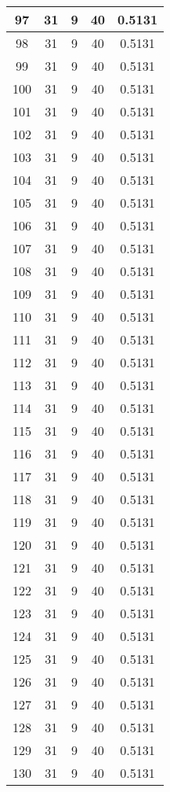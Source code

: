 \documentclass[letterpaper, 12pt]{article}
\begin{document}
\begin{longtable}{|c|c|c|c|c|}
\hline
97 & 31 & 9 & 40 & 0.5131 \\
\hline
98 & 31 & 9 & 40 & 0.5131 \\
\hline
99 & 31 & 9 & 40 & 0.5131 \\
\hline
100 & 31 & 9 & 40 & 0.5131 \\
\hline
101 & 31 & 9 & 40 & 0.5131 \\
\hline
102 & 31 & 9 & 40 & 0.5131 \\
\hline
103 & 31 & 9 & 40 & 0.5131 \\
\hline
104 & 31 & 9 & 40 & 0.5131 \\
\hline
105 & 31 & 9 & 40 & 0.5131 \\
\hline
106 & 31 & 9 & 40 & 0.5131 \\
\hline
107 & 31 & 9 & 40 & 0.5131 \\
\hline
108 & 31 & 9 & 40 & 0.5131 \\
\hline
109 & 31 & 9 & 40 & 0.5131 \\
\hline
110 & 31 & 9 & 40 & 0.5131 \\
\hline
111 & 31 & 9 & 40 & 0.5131 \\
\hline
112 & 31 & 9 & 40 & 0.5131 \\
\hline
113 & 31 & 9 & 40 & 0.5131 \\
\hline
114 & 31 & 9 & 40 & 0.5131 \\
\hline
115 & 31 & 9 & 40 & 0.5131 \\
\hline
116 & 31 & 9 & 40 & 0.5131 \\
\hline
117 & 31 & 9 & 40 & 0.5131 \\
\hline
118 & 31 & 9 & 40 & 0.5131 \\
\hline
119 & 31 & 9 & 40 & 0.5131 \\
\hline
120 & 31 & 9 & 40 & 0.5131 \\
\hline
121 & 31 & 9 & 40 & 0.5131 \\
\hline
122 & 31 & 9 & 40 & 0.5131 \\
\hline
123 & 31 & 9 & 40 & 0.5131 \\
\hline
124 & 31 & 9 & 40 & 0.5131 \\
\hline
125 & 31 & 9 & 40 & 0.5131 \\
\hline
126 & 31 & 9 & 40 & 0.5131 \\
\hline
127 & 31 & 9 & 40 & 0.5131 \\
\hline
128 & 31 & 9 & 40 & 0.5131 \\
\hline
129 & 31 & 9 & 40 & 0.5131 \\
\hline
130 & 31 & 9 & 40 & 0.5131 \\

\end{longtable}
\end{document}
